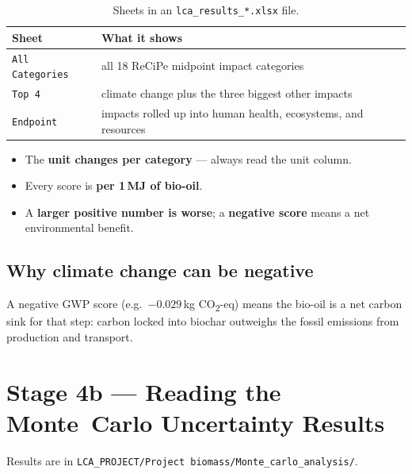 \documentclass[11pt, a4paper]{article}
\newcommand{\code}[1]{\texttt{#1}}
\begin{document}
\begin{table}[H]
\centering\small
\caption{Sheets in an \texttt{lca\_results\_*.xlsx} file.}
\begin{tabular}{@{}lL{9.3cm}@{}}
\toprule
\textbf{Sheet} & \textbf{What it shows} \\
\midrule
\code{All Categories} & all 18 ReCiPe midpoint impact categories \\
\code{Top 4}          & climate change plus the three biggest other impacts \\
\code{Endpoint}       & impacts rolled up into human health, ecosystems, and resources \\
\bottomrule
\end{tabular}
\end{table}

\begin{itemize}
  \item The \textbf{unit changes per category} — always read the unit column.
  \item Every score is \textbf{per 1\,MJ of bio-oil}.
  \item A \textbf{larger positive number is worse}; a \textbf{negative score} means a net environmental benefit.
\end{itemize}

\subsection{Why climate change can be negative}
\label{sec:negative}

A negative GWP score (e.g.\ $-0.029$\,kg CO\textsubscript{2}-eq) means the bio-oil is a net carbon sink for that step: carbon locked into biochar outweighs the fossil emissions from production and transport.

\section{Stage 4b — Reading the Monte~Carlo Uncertainty Results}

Results are in \code{LCA\_PROJECT/Project biomass/Monte\_carlo\_analysis/}.
\end{document}
